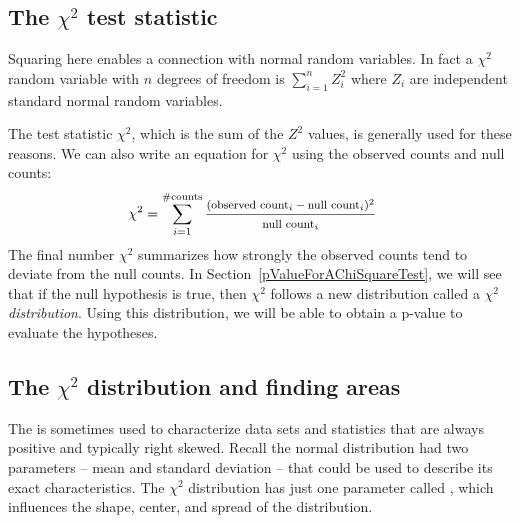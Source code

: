 \subsection{The $\chi^2$ test statistic}
\label{chiSquareTestStatistic}

Squaring here enables a connection with normal random variables. In fact a $\chi^2$ random variable with $n$ degrees of freedom is $\sum_{i=1}^n Z_i^2$ where $Z_i$ are independent standard normal random variables.

The test statistic $\chi^2$, which is the sum of the $Z^2$ values, is generally used for these reasons. We can also write an equation for $\chi^2$ using the observed counts and null counts:
{\begin{align*}
\chi^2 &= \sum_{i=1}^{\#\text{counts}}
	\frac
	{\text{\footnotesize$(\text{observed count}_i - \text{null count}_i)^2$}}
	{\text{\footnotesize$\text{null count}_i$}}
\end{align*}
}The final number $\chi^2$ summarizes how strongly the observed counts tend to deviate from the null counts. In Section~\ref{pValueForAChiSquareTest}, we will see that if the null hypothesis is true, then $\chi^2$ follows a new distribution called a \emph{$\chi^2$ distribution}. Using this distribution, we will be able to obtain a p-value to evaluate the hypotheses.


\subsection{The $\chi^2$ distribution and finding areas}

The  is sometimes used to characterize data sets and statistics that are always positive and typically right skewed. Recall the normal distribution had two parameters -- mean and standard deviation -- that could be used to describe its exact characteristics. The $\chi^2$ distribution has just one parameter called , which influences the shape, center, and spread of the distribution.


